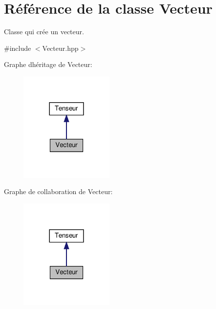 \hypertarget{class_vecteur}{}\section{Référence de la classe Vecteur}
\label{class_vecteur}


Classe qui crée un vecteur.  




{\ttfamily \#include $<$Vecteur.\+hpp$>$}



Graphe d\textquotesingle{}héritage de Vecteur\+:\nopagebreak
\begin{figure}[H]
\begin{center}
\leavevmode
\includegraphics[width=132pt]{class_vecteur__inherit__graph}
\end{center}
\end{figure}


Graphe de collaboration de Vecteur\+:\nopagebreak
\begin{figure}[H]
\begin{center}
\leavevmode
\includegraphics[width=132pt]{class_vecteur__coll__graph}
\end{center}
\end{figure}
